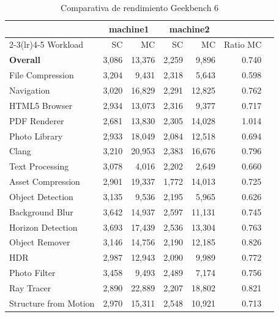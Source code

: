 \begin{table}[htbp]
\centering
\small
\caption{Comparativa de rendimiento Geekbench 6}
\label{tab:geekbench}
\begin{tabular}{lrrrrrr}
\toprule
 & \multicolumn{2}{c}{machine1} & \multicolumn{2}{c}{machine2} & \\
\cmidrule(lr){2-3}\cmidrule(lr){4-5}
Workload & SC & MC & SC & MC & Ratio MC \\
\midrule
\textbf{Overall} & 3,086 & 13,376 & 2,259 & 9,896 & 0.740 \\
\midrule
\quad File Compression & 3,204 & 9,431 & 2,318 & 5,643 & 0.598 \\
\quad Navigation & 3,020 & 16,829 & 2,291 & 12,825 & 0.762 \\
\quad HTML5 Browser & 2,934 & 13,073 & 2,316 & 9,377 & 0.717 \\
\quad PDF Renderer & 2,681 & 13,830 & 2,305 & 14,028 & 1.014 \\
\quad Photo Library & 2,933 & 18,049 & 2,084 & 12,518 & 0.694 \\
\quad Clang & 3,210 & 20,953 & 2,383 & 16,676 & 0.796 \\
\quad Text Processing & 3,078 & 4,016 & 2,202 & 2,649 & 0.660 \\
\quad Asset Compression & 2,901 & 19,337 & 1,772 & 14,013 & 0.725 \\
\quad Object Detection & 3,135 & 9,536 & 2,195 & 5,965 & 0.626 \\
\quad Background Blur & 3,642 & 14,937 & 2,597 & 11,131 & 0.745 \\
\quad Horizon Detection & 3,693 & 17,439 & 2,536 & 13,304 & 0.763 \\
\quad Object Remover & 3,146 & 14,756 & 2,190 & 12,185 & 0.826 \\
\quad HDR & 2,987 & 12,943 & 2,090 & 9,989 & 0.772 \\
\quad Photo Filter & 3,458 & 9,493 & 2,489 & 7,174 & 0.756 \\
\quad Ray Tracer & 2,890 & 22,889 & 2,207 & 18,802 & 0.821 \\
\quad Structure from Motion & 2,970 & 15,311 & 2,548 & 10,921 & 0.713 \\
\bottomrule
\end{tabular}
\end{table}
